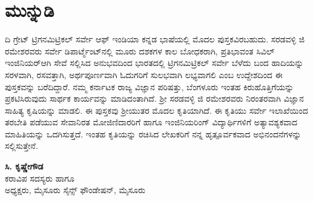 
\chapter*{ಮುನ್ನುಡಿ}

ದಿ ಗ್ರೇಟ್​ ಟ್ರಿಗನಮಿಟ್ರಿಕಲ್​ ಸರ್ವೇ ಆಫ್​ ಇಂಡಿಯಾ ಕನ್ನಡ ಭಾಷೆಯಲ್ಲಿ ಮೊದಲ ಪುಸ್ತಕ\-ವಿರಬಹುದು. ಸರಡವಳ್ಳಿ ಜಿ ರಮೇಶರವರು ಸರ್ವೇ ಡಿಪಾರ್ಟ್ಮೆಂಟ್​ನಲ್ಲಿ ಮೂರು ದಶಕಗಳ ಕಾಲ ಬೋಧಕರಾಗಿ, ಪ್ರತಿಭಾವಂತ ಸಿವಿಲ್​ ಇಂಜಿನಿಯರ್​ ಆಗಿ ಸೇವೆ ಸಲ್ಲಿಸಿದ ಅನುಭವದಿಂದ ಭಾರತದಲ್ಲಿ ಟ್ರಿಗನಮಿಟ್ರಿಕಲ್​ ಸರ್ವೇ ಬೆಳೆದು ಬಂದ ಹಾದಿಯನ್ನು ಸರಳವಾಗಿ, ರಸ\-ವತ್ತಾಗಿ, ಅರ್ಥಪೂರ್ಣವಾಗಿ ಓದುಗರಿಗೆ ಸುಲಭವಾಗಿ ಲಭ್ಯವಾಗಲಿ ಎಂಬ ಉದ್ದೇಶದಿಂದ ಈ ಪುಸ್ತಕವನ್ನು ಬರೆದಿದ್ದಾರೆ. ನಮ್ಮ ಕರ್ನಾಟಕ ರಾಜ್ಯ ವಿಜ್ಞಾನ ಪರಿಷತ್ತು, ಬೆಂಗಳೂರು ಇಂತಹ ಕಿರುಹೊತ್ತಿಗೆಯನ್ನು ಪ್ರಕಟಿಸಿರುವುದು ಸಾರ್ಥಕ ಕಾರ್ಯವನ್ನು ಮಾಡಿದಂತಾಗಿದೆ. ಶ‍್ರೀ ಸರಡವಳ್ಳಿ ಜಿ ರಮೇಶರವರು ನಿರಂತರವಾಗಿ ವಿಜ್ಞಾನ ಸಾಹಿತ್ಯ ಕೃಷಿಯನ್ನು ಮಾಡಲಿ. ಈ ಪುಸ್ತಕವು ಶ‍್ರೀಯುತರ ಮೊದಲ ಕೃತಿಯಾಗಿದೆ. ಈ ಕೃತಿಯು ಸರ್ವೇ ಇಲಾಖೆಯಿಂದ ತರಬೇತಿ ಪಡೆಯುವ ಸೇವಾನಿರತ ಮೋಜಿಣಿದಾರರಿಗೆ ಹಾಗೂ ಇಂಜಿನಿಯರಿಂಗ್​ ವಿದ್ಯಾರ್ಥಿಗಳಿಗೆ ಅತ್ಯಾವಶ್ಯಕವಾದ ಮಾಹಿತಿಯನ್ನು ಒದಗಿಸುತ್ತದೆ. ಇಂತಹ ಕೃತಿಯನ್ನು ರಚಿಸಿದ ಲೇಖಕ\-ರಿಗೆ ನನ್ನ ಹೃತ್ಪೂರ್ವಕವಾದ ಅಭಿನಂದನೆಗಳನ್ನು ಸಲ್ಲಿಸುತ್ತೇನೆ. 

\bigskip

\begin{flushright}
\textbf{ಸಿ. ಕೃಷ್ಣೇಗೌಡ}\\ ಕರಾವಿಪ ಸದಸ್ಯರು ಹಾಗೂ \\ ಅಧ್ಯಕ್ಷರು, ಮೈಸೂರು ಸೈನ್ಸ್ ಫೌಂಡೇಷನ್, ಮೈಸೂರು
\end{flushright}

